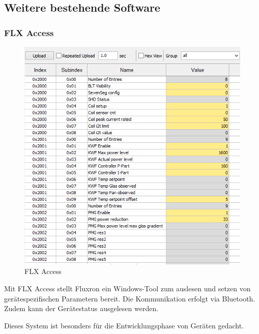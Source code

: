 \subsection{Weitere bestehende Software}
\label{subsec:Weitere bestehende Software}
\subsubsection{FLX Access}
\label{subsubsec:FLX Access}
\begin{figure}
  \begin{center}
  	\vspace{-26pt}
	\includegraphics[scale=0.5]{analysis/res/flxaccess}
	\caption{FLX Access}
	\vspace{-140pt}
  \end{center}
\end{figure}

Mit FLX Access stellt Fluxron ein Windows-Tool zum auslesen und setzen von gerätespezifischen Parametern bereit. Die Kommunikation erfolgt via Bluetooth. Zudem kann der Gerätestatus ausgelesen werden. 

Dieses System ist besonders für die Entwicklungsphase von Geräten gedacht.%
\vspace{100pt}
